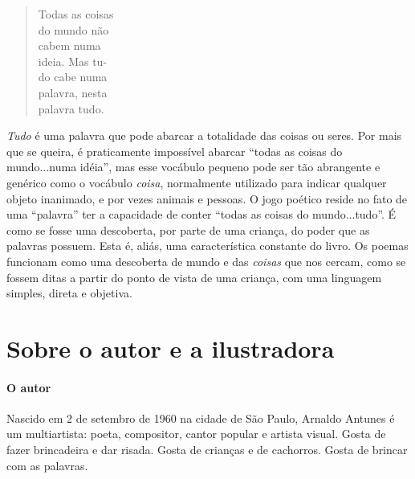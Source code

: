 \documentclass[11pt]{extarticle}
\begin{document}
\begin{verse}
Todas as coisas\\
do mundo não\\
cabem numa\\
ideia. Mas tu-\\
do cabe numa\\
palavra, nesta\\
palavra tudo.\\
\end{verse}

\textit{Tudo} é uma palavra que pode abarcar a totalidade das coisas ou seres. Por mais
que se queira, é praticamente impossível abarcar ``todas as coisas do mundo...numa idéia'',
mas esse vocábulo pequeno pode ser tão abrangente e genérico como o vocábulo \textit{coisa},
normalmente utilizado para indicar qualquer objeto inanimado, e por vezes animais e pessoas. 
O jogo poético reside no fato de uma ``palavra'' ter a capacidade de conter ``todas
as coisas do mundo...tudo''. É como se fosse uma descoberta, por parte de uma criança, do
poder que as palavras possuem. Esta é, aliás, uma característica constante do livro. Os
poemas funcionam como uma descoberta de mundo e das \textit{coisas} que nos cercam, como
se fossem ditas a partir do ponto de vista de uma criança, com uma linguagem simples,
direta e objetiva.


\reversemarginpar
\marginparwidth=5cm



\section{Sobre o autor e a ilustradora}

\paragraph{O autor}


Nascido em 2 de setembro de 1960 na cidade de São Paulo, Arnaldo Antunes é um multiartista: 
poeta, compositor, cantor popular e artista visual.
Gosta de fazer brincadeira e dar risada. Gosta de crianças e de cachorros.
Gosta de brincar com as palavras.
\end{document}

